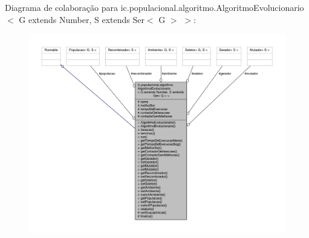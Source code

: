 Diagrama de colaboração para ic.\-populacional.\-algoritmo.\-Algoritmo\-Evolucionario$<$ G extends Number, S extends Ser$<$ G $>$ $>$\-:\nopagebreak
\begin{figure}[H]
\begin{center}
\leavevmode
\includegraphics[width=350pt]{classic_1_1populacional_1_1algoritmo_1_1_algoritmo_evolucionario_3_01_g_01extends_01_number_00_072e852bf86f09fc6e5514df3170af686}
\end{center}
\end{figure}
